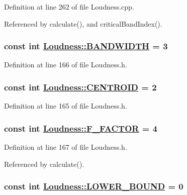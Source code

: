 Definition at line 262 of file Loudness.cpp.

Referenced by calculate(), and critical\-Band\-Index().\hypertarget{classLoudness_v3}{
\subsubsection[BANDWIDTH]{\setlength{\rightskip}{0pt plus 5cm}const int \hyperlink{classLoudness_v3}{Loudness::BANDWIDTH} = 3}}
\label{classLoudness_v3}




Definition at line 166 of file Loudness.h.\hypertarget{classLoudness_v2}{
\subsubsection[CENTROID]{\setlength{\rightskip}{0pt plus 5cm}const int \hyperlink{classLoudness_v2}{Loudness::CENTROID} = 2}}
\label{classLoudness_v2}




Definition at line 165 of file Loudness.h.\hypertarget{classLoudness_v4}{
\subsubsection[F\_\-FACTOR]{\setlength{\rightskip}{0pt plus 5cm}const int \hyperlink{classLoudness_v4}{Loudness::F\_\-FACTOR} = 4}}
\label{classLoudness_v4}




Definition at line 167 of file Loudness.h.

Referenced by calculate().\hypertarget{classLoudness_v0}{
\subsubsection[LOWER\_\-BOUND]{\setlength{\rightskip}{0pt plus 5cm}const int \hyperlink{classLoudness_v0}{Loudness::LOWER\_\-BOUND} = 0}}
\label{classLoudness_v0}


